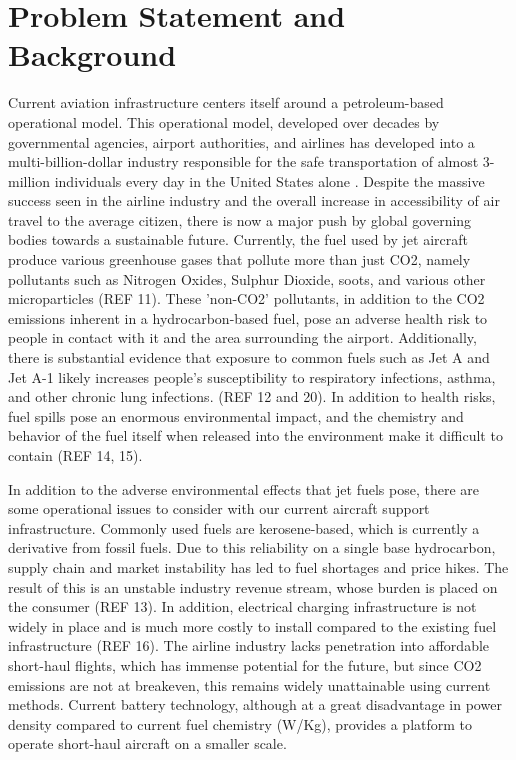\documentclass[../main.tex]{subfiles}
\begin{document}
\section{Problem Statement and Background}\label{probStatement}

Current aviation infrastructure centers itself around a petroleum-based operational model. This operational model, developed over decades by governmental agencies, airport authorities, and airlines has developed into a multi-billion-dollar industry responsible for the safe transportation of almost 3-million individuals every day in the United States alone \cite{ref19}. Despite the massive success seen in the airline industry and the overall increase in accessibility of air travel to the average citizen, there is now a major push by global governing bodies towards a sustainable future. Currently, the fuel used by jet aircraft produce various greenhouse gases that pollute more than just CO2, namely pollutants such as Nitrogen Oxides, Sulphur Dioxide, soots, and various other microparticles (REF 11). These 'non-CO2' pollutants, in addition to the CO2 emissions inherent in a hydrocarbon-based fuel, pose an adverse health risk to people in contact with it and the area surrounding the airport. Additionally, there is substantial evidence that exposure to common fuels such as Jet A and Jet A-1 likely increases people's susceptibility to respiratory infections, asthma, and other chronic lung infections. (REF 12 and 20). In addition to health risks, fuel spills pose an enormous environmental impact, and the chemistry and behavior of the fuel itself when released into the environment make it difficult to contain (REF 14, 15).\par 
In addition to the adverse environmental effects that jet fuels pose, there are some operational issues to consider with our current aircraft support infrastructure. Commonly used fuels are kerosene-based, which is currently a derivative from fossil fuels. Due to this reliability on a single base hydrocarbon, supply chain and market instability has led to fuel shortages and price hikes. The result of this is an unstable industry revenue stream, whose burden is placed on the consumer (REF 13). In addition, electrical charging infrastructure is not widely in place and is much more costly to install compared to the existing fuel infrastructure (REF 16). The airline industry lacks penetration into affordable short-haul flights, which has immense potential for the future, but since CO2 emissions are not at breakeven, this remains widely unattainable using current methods. Current battery technology, although at a great disadvantage in power density compared to current fuel chemistry (W/Kg), provides a platform to operate short-haul aircraft on a smaller scale.\par 
\end{document}
